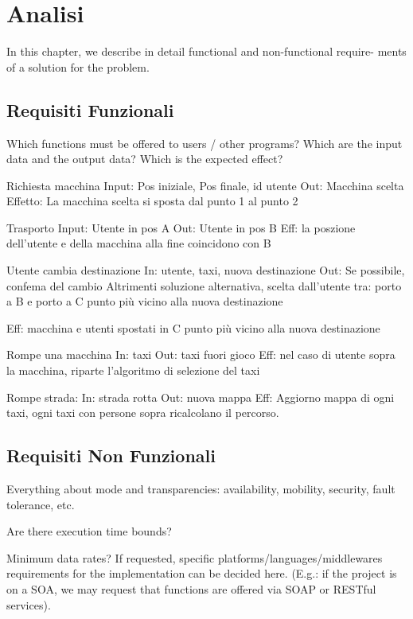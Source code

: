 \chapter{Analisi}
In this chapter, we describe in detail functional and non-functional require-
ments of a solution for the problem.

\section{Requisiti Funzionali}
Which functions must be offered to users / other programs? Which are the input data and the output data? Which is the expected effect?

Richiesta macchina
Input: Pos iniziale, Pos finale, id utente
Out: Macchina scelta
Effetto:
La macchina scelta si sposta dal punto 1 al punto 2

Trasporto
Input: Utente in pos A
Out: Utente in pos B
Eff: la poszione dell'utente e della macchina alla fine coincidono con B

Utente cambia destinazione
In: utente, taxi, nuova destinazione
Out: Se possibile, confema del cambio
	Altrimenti soluzione alternativa, scelta dall'utente tra: porto a B e porto a C punto più vicino alla nuova destinazione

Eff: macchina e utenti spostati in C punto più vicino alla nuova destinazione

Rompe una macchina
In: taxi
Out: taxi fuori gioco
Eff: nel caso di utente sopra la macchina, riparte l'algoritmo di selezione del taxi

Rompe strada: 
In: strada rotta
Out: nuova mappa
Eff: Aggiorno mappa di ogni taxi, ogni taxi con persone sopra ricalcolano il percorso.

\section{Requisiti Non Funzionali}
Everything about mode and transparencies: availability, mobility, security, fault tolerance, etc. 

Are there execution time bounds? 

Minimum data rates? If requested, specific platforms/languages/middlewares requirements for the implementation can be decided here. (E.g.: if the project is on a SOA, we may request that functions are offered via SOAP or RESTful services).